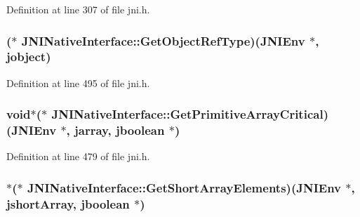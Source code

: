 Definition at line 307 of file jni.\-h.

\hypertarget{struct_j_n_i_native_interface_aadc70ec34b05d1b3ac1bb8b56ba6383f}{
\subsubsection[{Get\-Object\-Ref\-Type}]{($\ast$ J\-N\-I\-Native\-Interface\-::\-Get\-Object\-Ref\-Type)({\bf J\-N\-I\-Env} $\ast$, {\bf jobject})}}\label{struct_j_n_i_native_interface_aadc70ec34b05d1b3ac1bb8b56ba6383f}


Definition at line 495 of file jni.\-h.

\hypertarget{struct_j_n_i_native_interface_a83f9c87034f485c78686ace1aefa3fd9}{
\subsubsection[{Get\-Primitive\-Array\-Critical}]{\setlength{\rightskip}{0pt plus 5cm}void$\ast$($\ast$ J\-N\-I\-Native\-Interface\-::\-Get\-Primitive\-Array\-Critical)({\bf J\-N\-I\-Env} $\ast$, {\bf jarray}, {\bf jboolean} $\ast$)}}\label{struct_j_n_i_native_interface_a83f9c87034f485c78686ace1aefa3fd9}


Definition at line 479 of file jni.\-h.

\hypertarget{struct_j_n_i_native_interface_a35fb5b2b7bd0e9d19c1531c1170b6678}{
\subsubsection[{Get\-Short\-Array\-Elements}]{$\ast$($\ast$ J\-N\-I\-Native\-Interface\-::\-Get\-Short\-Array\-Elements)({\bf J\-N\-I\-Env} $\ast$, {\bf jshort\-Array}, {\bf jboolean} $\ast$)}}\label{struct_j_n_i_native_interface_a35fb5b2b7bd0e9d19c1531c1170b6678}


